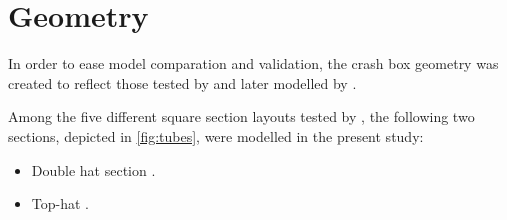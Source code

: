 \documentclass[cmfonts]{witpress}
\begin{document}
\section{Geometry}

In order to ease model comparation and validation, the crash box geometry was created to reflect those tested by \cite{Peroni2009} and later modelled by \cite{Scattina2011}.

Among the five different square section layouts tested by \cite{Peroni2009}, the following two sections, depicted in \cref{fig:tubes}, were modelled in the present study:
\begin{itemize}
	\item Double hat section \cite{Lee2006, Yang2012, Yamashita2013}.
	\item Top-hat \cite{Scattina2011, Yamashita2013}.
\end{itemize}
\end{document}
